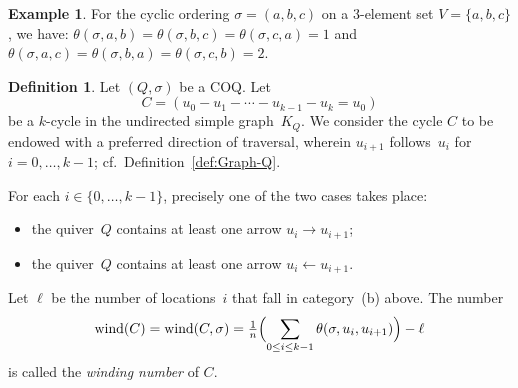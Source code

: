 \documentclass[11pt, letterpaper]{amsart}
\newcommand{\cS}[1]{{\noindent\textsf{\color{purple}$\blacksquare$~#1~$\blacksquare$}}}
\theoremstyle{definition}
\newtheorem{example}[theorem]{Example}
\newtheorem{definition}[theorem]{Definition}
\numberwithin{equation}{section}
\def\wind{{\operatorname{wind}}}
\newcommand\sgn{\operatorname{sgn}}
\newcommand\GQ{K_Q}
\begin{document}
\begin{example}
For the cyclic ordering $\sigma = (a,b,c)$ on a 3-element set $V=\{a,b,c\}$, we have:
$\theta(\sigma,a,b)=\theta(\sigma,b,c)=\theta(\sigma,c,a)=1$ and
$\theta(\sigma,a,c)=\theta(\sigma,b,a)=\theta(\sigma,c,b)=2$. 
\end{example}

\begin{definition}
\label{def:winding number}
Let $(Q,\sigma)$ be a COQ. 
Let 
\begin{equation}
\label{eq:u0...un}
C=(u_0 - u_1 - \cdots - u_{k-1} - u_k=u_0)
\end{equation}
be a $k$-cycle in the undirected simple graph~$\GQ$.
We consider the cycle $C$ to be endowed with a preferred direction of traversal, 
wherein $u_{i+1}$ follows~$u_i$ for $i=0,\dots,k-1$; 
cf.~Definition~\ref{def:Graph-Q}.

For each $i\in\{0,\dots,k-1\}$, precisely one of the two cases takes place:
\begin{itemize}[leftmargin=.27in]
\item[{\rm (a)}]
the quiver~$Q$ contains at least one arrow $u_i\rightarrow u_{i+1}$; 
\item[{\rm (b)}]
the quiver~$Q$ contains at least one arrow $u_i\leftarrow u_{i+1}$.
\end{itemize}
\pagebreak[3]
Let $\ell$ be the number of locations~$i$ that fall in category~(b) above. The number 
\begin{equation}
\label{eq:wind-n-cycle}
\wind(C)=\wind(C,\sigma) = \tfrac{1}{n} \Bigl ( \sum_{0\le i\le k-1} \theta(\sigma, u_i , u_{i+1}) \Bigr ) - \ell
\end{equation}
is called the \emph{winding number} of $C$. 
\end{definition}
\end{document}
